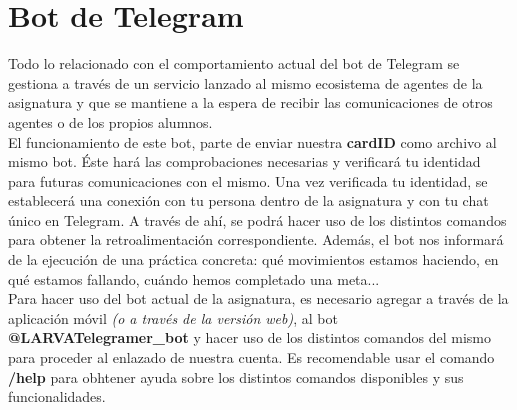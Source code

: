 \section{Bot de Telegram}

Todo lo relacionado con el comportamiento actual del bot de Telegram se gestiona a través de un servicio lanzado al mismo ecosistema de agentes de la asignatura y que se mantiene a la espera de recibir las comunicaciones de otros agentes o de los propios alumnos.\\

El funcionamiento de este bot, parte de enviar nuestra \textbf{cardID} como archivo al mismo bot. Éste hará las comprobaciones necesarias y verificará tu identidad para futuras comunicaciones con el mismo. Una vez verificada tu identidad, se establecerá una conexión con tu persona dentro de la asignatura y con tu chat único en Telegram. A través de ahí, se podrá hacer uso de los distintos comandos para obtener la retroalimentación correspondiente. Además, el bot nos informará de la ejecución de una práctica concreta: qué movimientos estamos haciendo, en qué estamos fallando, cuándo hemos completado una meta...\\

Para hacer uso del bot actual de la asignatura, es necesario agregar a través de la aplicación móvil \textit{(o a través de la versión web)}, al bot \textbf{@LARVATelegramer\_bot} y hacer uso de los distintos comandos del mismo para proceder al enlazado de nuestra cuenta. Es recomendable usar el comando \textbf{/help} para obhtener ayuda sobre los distintos comandos disponibles y sus funcionalidades.